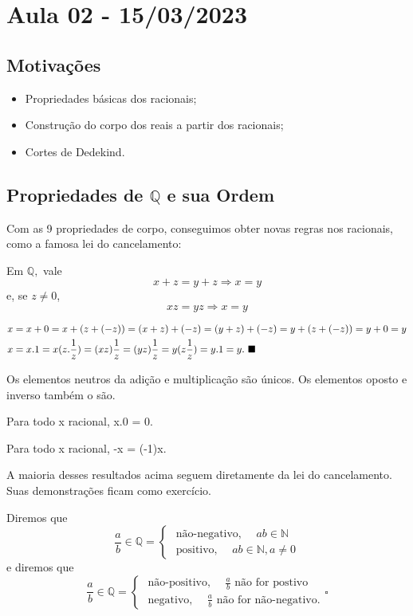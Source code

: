 \documentclass[Analysis/analysis_notes.tex]{subfiles}
\begin{document}
\section{Aula 02 - 15/03/2023}
\subsection{Motiva\c c\~oes}
\begin{itemize}
	\item Propriedades b\'asicas dos racionais;
	\item Constru\c c\~ao do corpo dos reais a partir dos racionais;
	\item Cortes de Dedekind.
\end{itemize}
\subsection{Propriedades de $\mathbb{Q}$ e sua Ordem}
Com as 9 propriedades de corpo, conseguimos obter novas regras nos racionais, como a famosa lei do cancelamento:
\begin{prop*}
	Em $\mathbb{Q},$ vale
	$$
		x + z = y + z \Rightarrow x = y
	$$
	e, se $z\neq{0}$,
	$$
		xz = yz \Rightarrow x = y
	$$
\end{prop*}
\begin{proof*}
	\begin{align*}
		 & x = x + 0 = x + (z + (-z)) = (x+z) + (-z) = (y + z) + (-z) = y + (z + (-z)) = y +0 = y                           \\
		 & x = x.1 = x(z.\frac{1}{z}) = (xz)\frac{1}{z} = (yz)\frac{1}{z} = y (z \frac{1}{z}) = y.1 = y. \text{ $\blacksquare$}
	\end{align*}
\end{proof*}
\begin{prop*}
	Os elementos neutros da adi\c c\~ao e multiplica\c c\~ao s\~ao \'unicos. Os elementos oposto e inverso tamb\'em o s\~ao.
\end{prop*}
\begin{prop*}
	Para todo x racional, x.0 = 0.
\end{prop*}
\begin{prop*}
	Para todo x racional, -x = (-1)x.
\end{prop*}
A maioria desses resultados acima seguem diretamente da lei do cancelamento. Suas demonstra\c c\~oes ficam como exerc\'icio.
\begin{def*}
	Diremos que
	$$
		\frac{a}{b}\in \mathbb{Q} = \left\{\begin{array}{ll}
			\text{ n\~ao-negativo, } \quad ab\in \mathbb{N} \\
			\text{ positivo, } \quad ab\in \mathbb{N}, a\neq 0
		\end{array}\right.
	$$
	e diremos que
	$$
		\frac{a}{b}\in \mathbb{Q} = \left\{\begin{array}{ll}
			\text{ n\~ao-positivo, } \quad \frac{a}{b} \text{ n\~ao for postivo} \\
			\text{ negativo, } \quad \frac{a}{b} \text{ n\~ao for n\~ao-negativo.}
		\end{array}\right.\square
	$$
\end{def*}
\end{document}
